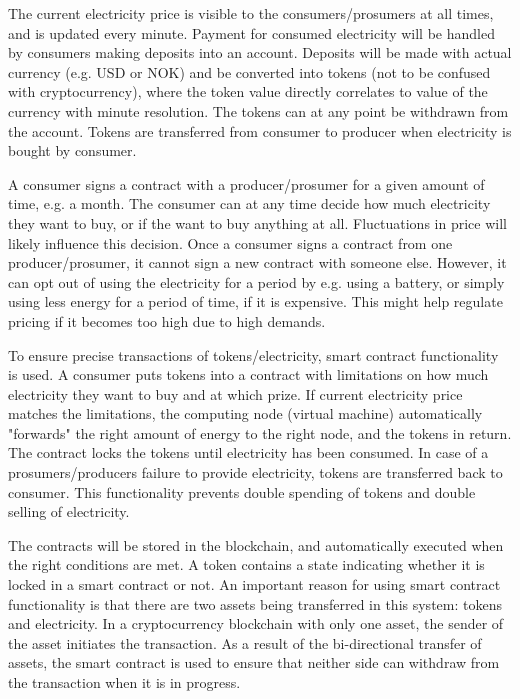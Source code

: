 The current electricity price is visible to the consumers/prosumers at all times, and is updated every minute. Payment for consumed electricity will be handled by consumers making deposits into an account. Deposits will be made with actual currency (e.g. USD or NOK) and be converted into tokens (not to be confused with cryptocurrency), where the token value directly correlates to value of the currency with minute resolution. The tokens can at any point be withdrawn from the account. Tokens are transferred from consumer to producer when electricity is bought by consumer. 

A consumer signs a contract with a producer/prosumer for a given amount of time, e.g. a month. The consumer can at any time decide how much electricity they want to buy, or if the want to buy anything at all. Fluctuations in price will likely influence this decision. Once a consumer signs a contract from one producer/prosumer, it cannot sign a new contract with someone else. However, it can opt out of using the electricity for a period by e.g. using a battery, or simply using less energy for a period of time, if it is expensive. This might help regulate pricing if it becomes too high due to high demands. 

To ensure precise transactions of tokens/electricity, smart contract functionality is used. A consumer puts tokens into a contract with limitations on how much electricity they want to buy and at which prize. If current electricity price matches the limitations, the computing node (virtual machine) automatically "forwards" the right amount of energy to the right node, and the tokens in return. The contract locks the tokens until electricity has been consumed. In case of a prosumers/producers failure to provide electricity, tokens are transferred back to consumer. This functionality prevents double spending of tokens and double selling of electricity.

The contracts will be stored in the blockchain, and automatically executed when the right conditions are met. A token contains a state indicating whether it is locked in a smart contract or not. An important reason for using smart contract functionality is that there are two assets being transferred in this system: tokens and electricity. In a cryptocurrency blockchain with only one asset, the sender of the asset initiates the transaction. As a result of the bi-directional transfer of assets, the smart contract is used to ensure that neither side can withdraw from the transaction when it is in progress. 

